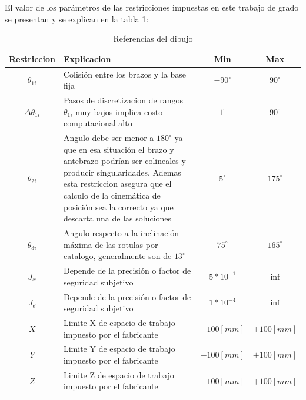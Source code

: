    \newpage
    
    El valor de los parámetros de las restricciones impuestas en este trabajo de grado se presentan y se explican en la tabla \ref{t:cap6_ws_1}: 
    
            \begingroup
            \renewcommand{\arraystretch}{1.5}
            \begin{table}[H]
            \centering
            \begin{tabular}{c m{7.5cm} c c}
               \hline
               \textbf{Restriccion}  & \textbf{Explicacion} & \textbf{Min}& \textbf{Max}\\
               \hline           \hline            
             $\theta_{1i}$ & Colisión entre los brazos y la base fija & $-90^{\circ}$ & $90^{\circ}$\\
            \hline
             $\Delta\theta _{1i}$ & Pasos de discretizacion de rangos $\theta_{1i}$ muy bajos implica costo computacional alto& $1^{\circ}$ & $90^{\circ}$ \\
            \hline
             $\theta _{2i}$ & Angulo debe ser menor a $180^{\circ}$ ya que en esa situación el brazo y antebrazo podrían ser colineales y producir singularidades. Ademas esta restriccion asegura que el calculo de la cinemática de posición sea la correcto ya que descarta una de las soluciones & $5^{\circ}$ & $175^{\circ}$ \\
            \hline
             $\theta _{3i}$ & Angulo respecto a la inclinación máxima de las rotulas por catalogo, generalmente son de $13^{\circ}$ & $75^{\circ}$ & $165^{\circ}$ \\
            \hline
             $J_{x}$ & Depende de la precisión o factor de seguridad subjetivo& $5*10^{-1}$ & $\inf$ \\
            \hline
             $J_{\theta}$ & Depende de la precisión o factor de seguridad subjetivo& $1*10^{-4}$ & $\inf$ \\
            \hline
             $X$ & Limite X de espacio de trabajo impuesto por el fabricante & $-100[mm]$ & $+100[mm]$ \\
            \hline            
             $Y$ & Limite Y de espacio de trabajo impuesto por el fabricante & $-100[mm]$ & $+100[mm]$ \\
            \hline   
             $Z$ & Limite Z de espacio de trabajo impuesto por el fabricante & $-100[mm]$ & $+100[mm]$ \\
            \hline   
            \end{tabular}
            \caption{Referencias del dibujo}
            \label{t:cap6_ws_1}
        \end{table}
        \endgroup     
        
